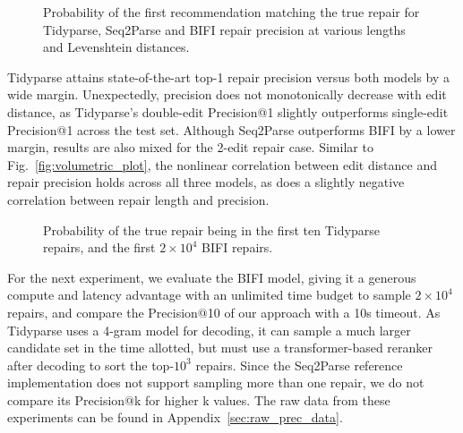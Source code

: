 \documentclass[sigplan,review,acmsmall,nonacm,screen,anonymous]{acmart}\settopmatter{printfolios=false,printccs=false,printacmref=false}
\begin{document}
\begin{figure}[h!]
\resizebox{.29\textwidth}{!}{}\hspace{0.5cm}
\resizebox{.29\textwidth}{!}{}\hspace{0.5cm}
\resizebox{.29\textwidth}{!}{}
\caption{Probability of the first recommendation matching the true repair for Tidyparse, Seq2Parse and BIFI repair precision at various lengths and Levenshtein distances.}\label{fig:len_dist_prec}
\end{figure}\vspace{-0.2cm}

Tidyparse attains state-of-the-art top-1 repair precision versus both models by a wide margin. Unexpectedly, precision does not monotonically decrease with edit distance, as Tidyparse's double-edit Precision@1 slightly outperforms single-edit Precision@1 across the test set. Although Seq2Parse outperforms BIFI by a lower margin, results are also mixed for the 2-edit repair case. Similar to Fig.~\ref{fig:volumetric_plot}, the nonlinear correlation between edit distance and repair precision holds across all three models, as does a slightly negative correlation between repair length and precision.

\begin{figure}
\vspace{-0.1cm}
\resizebox{.24\textwidth}{!}{}
\resizebox{.24\textwidth}{!}{}
\caption{Probability of the true repair being in the first ten Tidyparse repairs, and the first $2\times10^4$ BIFI repairs.}\label{fig:len_dist_prec_all}
\vspace{-0.3cm}
\end{figure}

For the next experiment, we evaluate the BIFI model, giving it a generous compute and latency advantage with an unlimited time budget to sample $2\times10^4$ repairs, and compare the Precision@10 of our approach with a 10s timeout. As Tidyparse uses a 4-gram model for decoding, it can sample a much larger candidate set in the time allotted, but must use a transformer-based reranker after decoding to sort the top-$10^3$ repairs. Since the Seq2Parse reference implementation does not support sampling more than one repair, we do not compare its Precision@k for higher k values. The raw data from these experiments can be found in Appendix~\ref{sec:raw_prec_data}.
\end{document}
